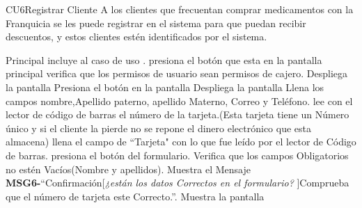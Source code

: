  \begin{UseCase}{CU6}{Registrar Cliente}{
	A los clientes que frecuentan comprar medicamentos con la Franquicia se les puede registrar en el sistema para que puedan recibir descuentos, y estos clientes estén identificados por el sistema.
	}
	\end{UseCase}
	\begin{UCtrayectoria}{Principal}
		\UCpaso incluye al caso de uso .
		\UCpaso [\UCactor] presiona el botón  que esta en la pantalla principal  
		\UCpaso verifica que los permisos de usuario sean permisos de cajero. 
		\UCpaso Despliega la pantalla  
		\UCpaso [\UCactor] Presiona el botón  en la pantalla 
		\UCpaso Despliega la pantalla 
		\UCpaso [\UCactor] Llena los campos nombre,Apellido paterno, apellido Materno, Correo y Teléfono.
		\UCpaso [\UCactor] lee con el lector de código de barras el número de la tarjeta.(Esta tarjeta tiene un Número único y si el cliente la pierde no se repone el dinero electrónico que esta almacena)
		\UCpaso llena el campo de ``Tarjeta" con lo que fue leído por el lector de Código de barras.
		\UCpaso [\UCactor] presiona el botón  del formulario.
		\UCpaso Verifica que los campos Obligatorios no estén Vacíos(Nombre y apellidos).
		\UCpaso Muestra el Mensaje {\bf MSG6-}``Confirmación[{\em ¿están los datos Correctos en el formulario? }]Comprueba que el número de tarjeta este Correcto.''.
		\UCpaso Muestra la pantalla 
	\end{UCtrayectoria}

